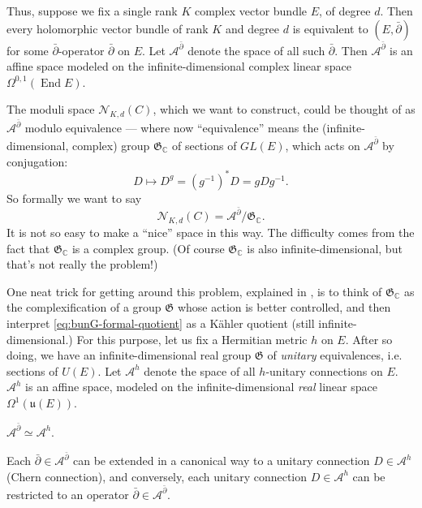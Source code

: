 \documentclass[12pt,letterpaper,reqno]{article}
\numberwithin{equation}{section}
\newcommand{\fu}{{\mathfrak u}}
\newcommand{\fG}{{\mathfrak G}}
\newcommand{\cN}{\ensuremath{\mathcal N}}
\newcommand{\cA}{\ensuremath{\mathcal A}}
\newcommand{\C}{\ensuremath{\mathbb C}}
\newcommand{\kahler}{K\"ahler\xspace}
\newcommand{\ti}[1]{\textit{#1}}
\DeclareMathOperator{\End}{End}
\begin{document}
Thus, suppose we fix a single rank $K$ complex vector bundle $E$, 
of degree $d$. Then every holomorphic vector bundle of rank $K$
and degree $d$ is equivalent to $(E, \bar\partial)$ for some
$\bar\partial$-operator $\bar\partial$ on $E$.
Let $\cA^{\bar\partial}$ denote the space of all such $\bar\partial$.
Then $\cA^{\bar\partial}$ is an affine space modeled on the 
infinite-dimensional complex linear space $\Omega^{0,1}(\End E)$.

The moduli space $\cN_{K,d}(C)$, which we want to construct, 
could be thought of as
$\cA^{\bar\partial}$ modulo equivalence --- where now ``equivalence'' means
the (infinite-dimensional,
complex) group $\fG_\C$ of sections of $GL(E)$,
which acts on $\cA^{\bar\partial}$ by conjugation:
\begin{equation}
  D \mapsto D^g = (g^{-1})^* D = g D g^{-1}.  
\end{equation}
So formally we want to say
\begin{equation} \label{eq:bunG-formal-quotient}
  \cN_{K,d}(C) = \cA^{\bar\partial} / \fG_\C.
\end{equation}
It is not so easy to make a ``nice'' space in this way.
The difficulty comes from the 
fact that $\fG_\C$ is a complex group.
(Of course $\fG_\C$ is also infinite-dimensional,
but that's not really the problem!)

One neat trick for getting around this problem, 
explained in \cite{MR85k:14006}, 
is to think of $\fG_\C$ as the complexification of a
group $\fG$ whose action is better controlled, and 
then interpret \eqref{eq:bunG-formal-quotient}
as a \kahler quotient (still infinite-dimensional.)
For this purpose, let us fix a Hermitian metric $h$ on $E$.
After so doing, we have an infinite-dimensional real group
$\fG$ of \ti{unitary} equivalences, i.e. sections of $U(E)$.
Let $\cA^h$ denote the space of all $h$-unitary connections
on $E$.
$\cA^h$ is an affine space, modeled
on the infinite-dimensional \ti{real} linear space $\Omega^{1}(\fu(E))$.

\begin{prop}[Unitary connections = holomorphic structures] 
$\cA^{\bar\partial} \simeq \cA^h$.
\end{prop}
\begin{pf} Each $\bar\partial \in \cA^{\bar\partial}$
can be extended in a canonical way to a unitary connection $D \in \cA^h$
(Chern connection), and conversely, each unitary connection $D \in \cA^h$ 
can be restricted to an operator $\bar\partial \in \cA^{\bar\partial}$.
\end{pf}
\end{document}
